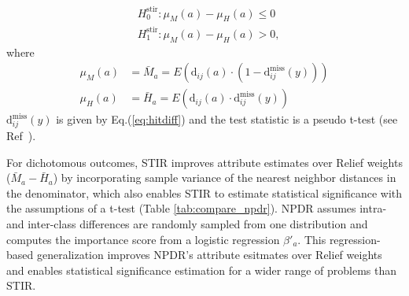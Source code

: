 \documentclass[10pt]{article}
\begin{document}

\begin{equation}
\begin{aligned}
    & H^{\text{stir}}_0: \mu_M(a) - \mu_H(a) \le 0 \\
    & H^{\text{stir}}_1: \mu_M(a) - \mu_H(a) > 0,
\end{aligned}
\end{equation}  
where
\begin{equation}
\begin{aligned}
    \mu_M(a) & = \bar{M}_a = E \left( \text{d}_{ij}(a) \cdot \left( 1-\text{d}^{\text{miss}}_{ij}(y) \right) \right) \\
    \mu_H(a) & = \bar{H}_a = E \left( \text{d}_{ij}(a) \cdot        \text{d}^{\text{miss}}_{ij}(y)           \right)
\end{aligned}
\end{equation}  
$\text{d}^{\text{miss}}_{ij}(y)$ is given by Eq.(\ref{eq:hitdiff}) and the test statistic is a pseudo t-test (see Ref~\cite{stir}).

For dichotomous outcomes, STIR improves attribute estimates over Relief weights ($\bar{M}_a - \bar{H}_a$) by incorporating sample variance of the nearest neighbor distances in the denominator, which also enables STIR to estimate statistical significance with the assumptions of a t-test (Table \ref{tab:compare_npdr}).
NPDR assumes intra- and inter-class differences are randomly sampled from one distribution and computes the importance score from a logistic regression $\beta'_a$.
This regression-based generalization improves NPDR's attribute esitmates over Relief weights and enables statistical significance estimation for a wider range of problems than STIR.
\end{document}
